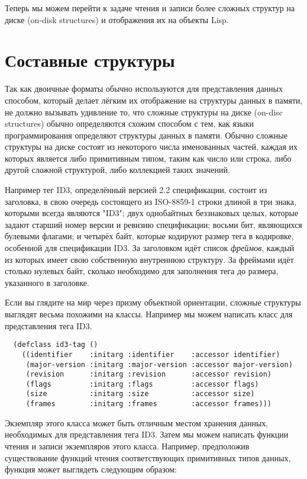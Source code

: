 Теперь мы можем перейти к задаче чтения и записи более сложных структур на диске (on-disk
structures) и отображения их на объекты Lisp.

\section{Составные структуры}

Так как двоичные форматы обычно используются для представления данных способом, который
делает лёгким их отображение на структуры данных в памяти, не должно вызывать удивление
то, что сложные структуры на диске (on-disc structures) обычно определяются схожим
способом с тем, как языки программирования определяют структуры данных в памяти. Обычно
сложные структуры на диске состоят из некоторого числа именованных частей, каждая их
которых является либо примитивным типом, таким как число или строка, либо другой сложной
структурой, либо коллекцией таких значений.

Например тег ID3, определённый версией 2.2 спецификации, состоит из заголовка, в свою
очередь состоящего из ISO-8859-1 строки длиной в три знака, которыми всегда являются
"ID3"; двух однобайтных беззнаковых целых, которые задают старший номер версии и ревизию
спецификации; восьми бит, являющихся булевыми флагами; и четырёх байт, которые кодируют
размер тега в кодировке, особенной для спецификации ID3. За заголовком идёт список
\textit{фреймов}, каждый из которых имеет свою собственную внутреннюю структуру. За
фреймами идёт столько нулевых байт, сколько необходимо для заполнения тега до размера,
указанного в заголовке.

Если вы глядите на мир через призму объектной ориентации, сложные структуры выглядят
весьма похожими на классы. Например мы можем написать класс для представления тега ID3.

\begin{lstlisting}
  (defclass id3-tag ()
    ((identifier    :initarg :identifier    :accessor identifier)
     (major-version :initarg :major-version :accessor major-version)
     (revision      :initarg :revision      :accessor revision)
     (flags         :initarg :flags         :accessor flags)
     (size          :initarg :size          :accessor size)
     (frames        :initarg :frames        :accessor frames)))
\end{lstlisting}

Экземпляр этого класса может быть отличным местом хранения данных, необходимых для
представления тега ID3. Затем мы можем написать функции чтения и записи экземпляров этого
класса. Например, предположив существование функций чтения соответствующих примитивных
типов данных, функция  может выглядеть следующим образом:

